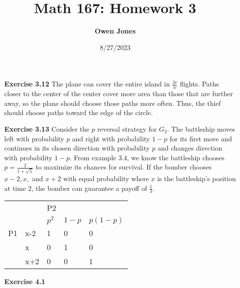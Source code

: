 \documentclass[10pt]{article}[H]
\title{\bf Math 167: Homework 3}
\date{8/27/2023}
\author{\bf Owen Jones}
\begin{document}
\maketitle
\begin{itemize}
    \item [\textbf{Exercise 3.12}] The plane can cover the entire island in $\frac{2r}{w}$ flights. Paths closer to the center of the center cover more area than those that are further away, so the plane should choose those paths more often. Thus, the thief should choose paths toward the edge of the circle.
    
    \item [\textbf{Exercise 3.13}] Consider the $p$ reversal strategy for $G_2$. The battleship moves left with probability $p$ and right with probability $1-p$ for its first move and continues in its chosen direction with probability $p$ and changes direction with probability $1-p$. 
    From example $3.4$, we know the battleship chooses $p=\frac{2}{1+\sqrt{5}}$ to maximize its chances for survival. If the bomber chooses $x-2,x,$ and $x+2$ with equal probability where $x$ is the battleship's position at time $2$, the bomber can guarantee a payoff of $\frac{1}{3}$.
    \begin{table}[H]
        \begin{tabular}{lllll}
                                &                          & P2                         &                            &                               \\ \cline{2-5} 
        \multicolumn{1}{l|}{}   & \multicolumn{1}{l|}{}    & \multicolumn{1}{l|}{$p^2$} & \multicolumn{1}{l|}{$1-p$} & \multicolumn{1}{l|}{$p(1-p)$} \\ \cline{2-5} 
        \multicolumn{1}{l|}{P1} & \multicolumn{1}{l|}{x-2} & \multicolumn{1}{l|}{1}     & \multicolumn{1}{l|}{0}     & \multicolumn{1}{l|}{0}        \\ \cline{2-5} 
        \multicolumn{1}{l|}{}   & \multicolumn{1}{l|}{x}   & \multicolumn{1}{l|}{0}     & \multicolumn{1}{l|}{1}     & \multicolumn{1}{l|}{0}        \\ \cline{2-5} 
        \multicolumn{1}{l|}{}   & \multicolumn{1}{l|}{x+2} & \multicolumn{1}{l|}{0}     & \multicolumn{1}{l|}{0}     & \multicolumn{1}{l|}{1}        \\ \cline{2-5} 
        \end{tabular}
        \end{table}
    \item [\textbf{Exercise 4.1}] 
    \begin{align*}

\end{align*}
\end{itemize}
\end{document}

